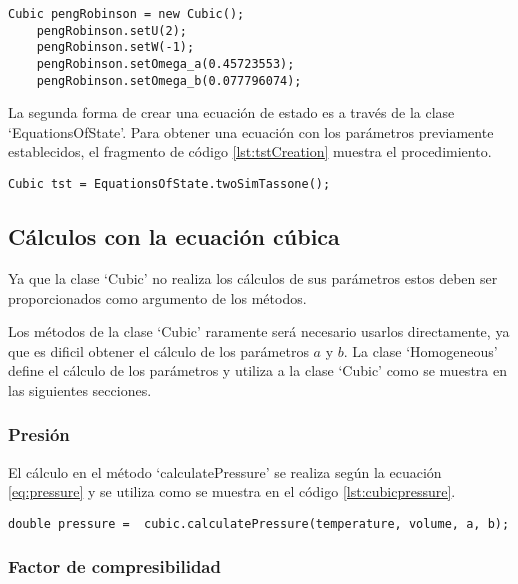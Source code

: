 	\begin{lstlisting}[label={lst:pengRobinsonCreation},caption=Creación de la ecuación de estado de Peng Robinson usando los metodos `Set' de los parametros u y w]
	Cubic pengRobinson = new Cubic();
	pengRobinson.setU(2);
	pengRobinson.setW(-1);
	pengRobinson.setOmega_a(0.45723553);
	pengRobinson.setOmega_b(0.077796074);
	\end{lstlisting}

	La segunda forma de crear una ecuación de estado es a través de la clase `EquationsOfState'. Para obtener una ecuación con los parámetros previamente establecidos, el fragmento de código \ref{lst:tstCreation} muestra el procedimiento.


	\begin{lstlisting}[label=lst:tstCreation,caption=Creación de la ecuación de estado de TST usando la clase `EquationsOfState']
	Cubic tst = EquationsOfState.twoSimTassone();
	\end{lstlisting}

\subsection{Cálculos con la ecuación cúbica}
	Ya que la clase `Cubic' no realiza los cálculos de sus parámetros estos deben ser proporcionados como argumento de los métodos.

	Los métodos de la clase `Cubic' raramente será necesario usarlos directamente, ya que es dificil obtener el cálculo de los parámetros $a$ y $b$. La clase `Homogeneous' define el cálculo de los parámetros y utiliza a la clase `Cubic' como se muestra en las siguientes secciones.

	\subsubsection{Presión}
	El cálculo en el método `calculatePressure' se realiza según la ecuación \ref{eq:pressure} y se utiliza como se muestra en el código \ref{lst:cubicpressure}.
\begin{lstlisting}[label={lst:cubicpressure},caption={Cálculo de presión con una ecuación de estado cúbica, proporcionando como argumento la temperatura, el volumen y los parámetros $a$,$b$}]
	 double pressure =  cubic.calculatePressure(temperature, volume, a, b);
\end{lstlisting}
	\subsubsection{Factor de compresibilidad}

